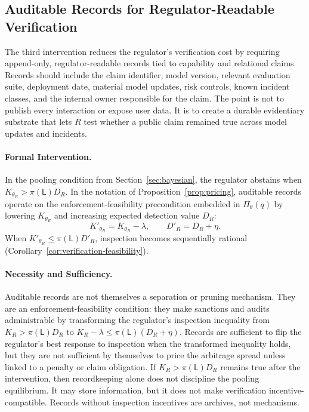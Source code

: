 \documentclass[review,authoryear]{elsarticle}
\theoremstyle{definition}
\theoremstyle{plain}
\begin{document}
\subsection{Auditable Records for Regulator-Readable Verification}
\label{subsec:auditable-records}

The third intervention reduces the regulator's verification cost by requiring
append-only, regulator-readable records tied to capability and relational
claims. Records should include the claim identifier, model version, relevant
evaluation suite, deployment date, material model updates, risk controls,
known incident classes, and the internal owner responsible for the claim. The
point is not to publish every interaction or expose user data. It is to create a
durable evidentiary substrate that lets $R$ test whether a public claim remained
true across model updates and incidents.

\paragraph{Formal Intervention.}
In the pooling condition from Section~\ref{sec:bayesian}, the
regulator abstains when $K_{\theta_R}>\pi(\mathsf{L})D_R$.  In the notation of
Proposition~\ref{prop:pricing}, auditable records operate on the
enforcement-feasibility precondition embedded in $\Pi_\theta(q)$ by
lowering $K_{\theta_R}$ and increasing expected detection value $D_R$:
\[
K'_{\theta_R}=K_{\theta_R}-\lambda,\qquad
D'_R=D_R+\eta .
\]
When $K'_{\theta_R}\leq \pi(\mathsf{L})D'_R$, inspection becomes sequentially
rational (Corollary~\ref{cor:verification-feasibility}).

\paragraph{Necessity and Sufficiency.}
Auditable records are not themselves a separation or pruning mechanism.
They are an enforcement-feasibility condition: they make sanctions and audits
administrable by transforming the regulator's inspection inequality from
$K_R>\pi(\mathsf{L})D_R$ to $K_R-\lambda \le \pi(\mathsf{L})(D_R+\eta)$.
Records are sufficient to flip the regulator's best response to inspection when
the transformed inequality holds, but they are not sufficient by themselves to
price the arbitrage spread unless linked to a penalty or claim obligation.
If $K_R>\pi(\mathsf{L})D_R$ remains true after the intervention, then
recordkeeping alone does not discipline the pooling equilibrium.  It may store
information, but it does not make verification incentive-compatible.  Records
without inspection incentives are archives, not mechanisms.
\end{document}
